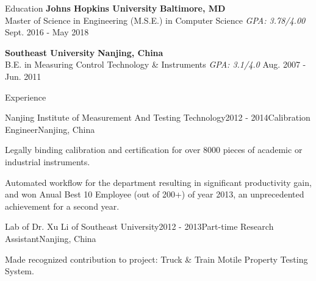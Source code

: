 \documentclass{resume} %
\begin{document}

\begin{rSection}{Education}
{\bf Johns Hopkins University} \hfill {\bf Baltimore, MD} \\
{Master of Science in Engineering (M.S.E.) in Computer Science} {\em GPA: 3.78/4.00} \hfill {Sept. 2016 - May 2018}

{\bf Southeast University} \hfill {\bf Nanjing, China} \\
{B.E. in Measuring Control Technology \& Instruments} {\em GPA: 3.1/4.0} \hfill {Aug. 2007 - Jun. 2011}
\end{rSection}



\begin{rSection}{Experience}

\begin{rSubsection}{Nanjing Institute of Measurement And Testing Technology}{2012 - 2014}{Calibration Engineer}{Nanjing, China}
\item Legally binding calibration and certification for over 8000 pieces of academic or industrial instruments.
\item Automated workflow for the department resulting in significant productivity gain, and won Anual Best 10 Employee (out of 200+) of year 2013, an unprecedented achievement for a second year.
\end{rSubsection}

\begin{rSubsection}{Lab of Dr. Xu Li of Southeast University}{2012 - 2013}{Part-time Research Assistant}{Nanjing, China}
\item Made recognized contribution to project: Truck \& Train Motile Property Testing System.
\end{rSubsection}
\end{rSection}
\end{document}
